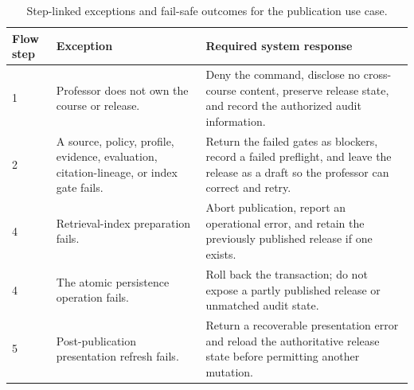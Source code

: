 \begin{table}[htbp]
  \centering
  \small
  \begin{tabularx}{\textwidth}{p{}p{}X}
    \toprule
    Flow step & Exception & Required system response \\
    \midrule
    1 & Professor does not own the course or release. & Deny the command, disclose no cross-course content, preserve release state, and record the authorized audit information. \\
    2 & A source, policy, profile, evidence, evaluation, citation-lineage, or index gate fails. & Return the failed gates as blockers, record a failed preflight, and leave the release as a draft so the professor can correct and retry. \\
    4 & Retrieval-index preparation fails. & Abort publication, report an operational error, and retain the previously published release if one exists. \\
    4 & The atomic persistence operation fails. & Roll back the transaction; do not expose a partly published release or unmatched audit state. \\
    5 & Post-publication presentation refresh fails. & Return a recoverable presentation error and reload the authoritative release state before permitting another mutation. \\
    \bottomrule
  \end{tabularx}
  \caption{Step-linked exceptions and fail-safe outcomes for the publication use case.}
  \label{tab:publication-exception-flow}
\end{table}
